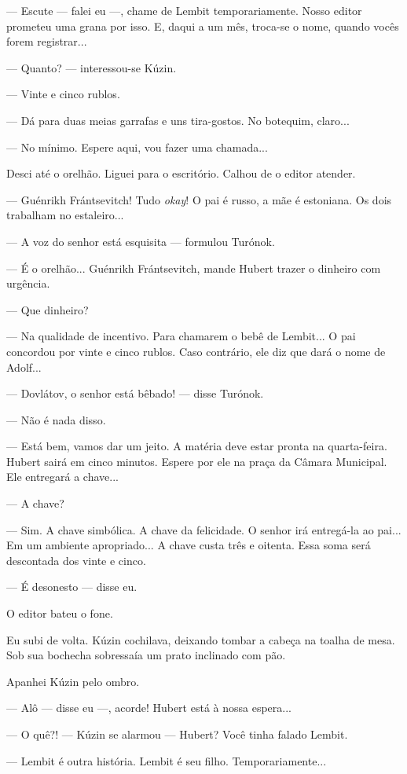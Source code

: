 --- Escute --- falei eu ---, chame de Lembit temporariamente. Nosso
editor prometeu uma grana por isso. E, daqui a um mês, troca-se o nome,
quando vocês forem registrar...

--- Quanto? --- interessou-se Kúzin.

--- Vinte e cinco rublos.

--- Dá para duas meias garrafas e uns tira-gostos. No botequim, claro...

--- No mínimo. Espere aqui, vou fazer uma chamada...

Desci até o orelhão. Liguei para o escritório. Calhou de o editor
atender.

--- Guénrikh Frántsevitch! Tudo \emph{okay}! O pai é russo, a mãe é
estoniana. Os dois trabalham no estaleiro...

--- A voz do senhor está esquisita --- formulou Turónok.

--- É o orelhão... Guénrikh Frántsevitch, mande Hubert trazer o dinheiro
com urgência.

--- Que dinheiro?

--- Na qualidade de incentivo. Para chamarem o bebê de Lembit... O pai
concordou por vinte e cinco rublos. Caso contrário, ele diz que dará o
nome de Adolf...

--- Dovlátov, o senhor está bêbado! --- disse Turónok.

--- Não é nada disso.

--- Está bem, vamos dar um jeito. A matéria deve estar pronta na
quarta-feira. Hubert sairá em cinco minutos. Espere por ele na praça da
Câmara Municipal. Ele entregará a chave...

--- A chave?

--- Sim. A chave simbólica. A chave da felicidade. O senhor irá
entregá-la ao pai... Em um ambiente apropriado... A chave custa três e
oitenta. Essa soma será descontada dos vinte e cinco.

--- É desonesto --- disse eu.

O editor bateu o fone.

Eu subi de volta. Kúzin cochilava, deixando tombar a cabeça na toalha de
mesa. Sob sua bochecha sobressaía um prato inclinado com pão.

Apanhei Kúzin pelo ombro.

--- Alô --- disse eu ---, acorde! Hubert está à nossa espera...

--- O quê?! --- Kúzin se alarmou --- Hubert? Você tinha falado Lembit.

--- Lembit é outra história. Lembit é seu filho. Temporariamente...

